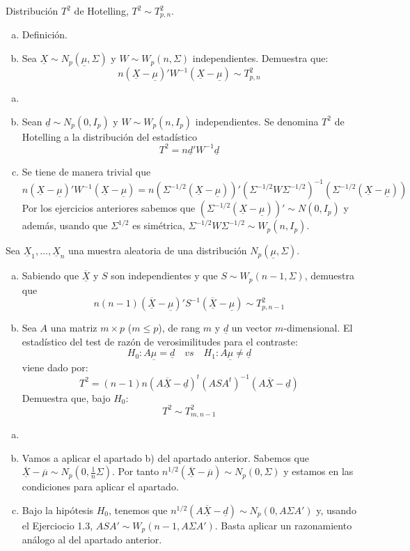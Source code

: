 \documentclass[twoside]{article}
\newcommand{\media}[1]{{\overline{#1}}}
\newcommand{\muestra}[1]{{\underline{#1}}}
\newcommand{\m}[1]{{\muestra{#1}}}
\newcommand{\mX}{{\muestra{X}}}
\begin{document}
\begin{ejercicio}{1.4}
Distribución $T^2$ de Hotelling, $T^2 \sim T^2_{p,n}$.
\begin{enumerate}[(a)]
\item Definición.
\item Sea $\mX \sim N_p(\m{μ},Σ)$ y $W \sim W_p(n,Σ)$ independientes. Demuestra que:
\[ n(\mX-\m{μ})' W^{-1} (\mX-\m{μ}) \sim T^2_{p,n} \]
\end{enumerate}
\end{ejercicio}
\begin{solucion}
\begin{enumerate}[(a)]
\item[]
\item Sean $\muestra{d}\sim N_p(0,I_p)$ y $W\sim W_p(n,I_p)$ independientes. Se denomina $T^2$ de Hotelling a la distribución del estadístico 
$$
T^2= n\muestra{d}'W^{-1}\muestra{d}
$$
\item Se tiene de manera trivial que
$$
n(\mX-\m{μ})' W^{-1} (\mX-\m{μ}) =n(\Sigma^{-1/2}(\mX-\m{μ}))'(\Sigma^{-1/2} W \Sigma^{-1/2})^{-1}(\Sigma^{-1/2} (\mX-\m{μ}))
$$
Por los ejercicios anteriores sabemos que $(\Sigma^{-1/2}(\mX-\m{μ}))' \sim N(0,I_p)$ y además, usando que $\Sigma^{1/2}$ es simétrica, $\Sigma^{-1/2} W \Sigma^{-1/2} \sim W_p(n,I_p)$.
\end{enumerate}
\end{solucion}
\newpage

\begin{ejercicio}{1.5}
Sea $\mX_1,\dots,\mX_n$ una muestra aleatoria de una distribución $N_p(\m{μ},Σ)$.
\begin{enumerate}[(a)]
\item Sabiendo que $\media{\mX}$ y $S$ son independientes y que $S \sim W_p(n-1,Σ)$, demuestra que
\[ n(n-1)(\media{\mX}-\m{μ})' S^{-1} (\media{\mX}-\m{μ}) \sim T^2_{p,n-1}\]
\item Sea $A$ una matriz $m\times p$ ($m≤p$), de rang $m$ y $\m{d}$ un vector $m$-dimensional.
El estadístico del test de razón de verosimilitudes para el contraste:
\[ H_0 \colon A\m{μ} = \m{d} \quad vs \quad H_1 \colon A\m{μ} \neq \m{d} \]
viene dado por:
\[ T^2 = (n-1)n (A\media{\mX}-\muestra{d})^t (ASA^t)^{-1} (A \media{\mX}-\m{d}) \]
Demuestra que, bajo $H_0$:
\[ T^2 \sim T^2_{m,n-1} \]
\end{enumerate}
\end{ejercicio}
\begin{solucion}
\begin{enumerate}[(a)]
\item[]
\item Vamos a aplicar el apartado b) del apartado anterior. Sabemos que $\media{\mX}-\media{\mu}\sim N_p(0,  \frac{1}{n}\Sigma)$. Por tanto $n^{1/2}(\media{\mX}-\media{\mu})\sim N_p(0, \Sigma)$ y estamos en las condiciones para aplicar el apartado.
\item Bajo la hipótesis $H_0$, tenemos que $n^{1/2}(A\media{\mX}-\muestra{d})\sim N_p(0,A\Sigma A')$ y, usando el Ejerciocio 1.3,  $ASA'\sim W_p(n-1,A\Sigma A')$. Basta aplicar un razonamiento análogo al del apartado anterior.
\end{enumerate}
\end{solucion}
\end{document}
